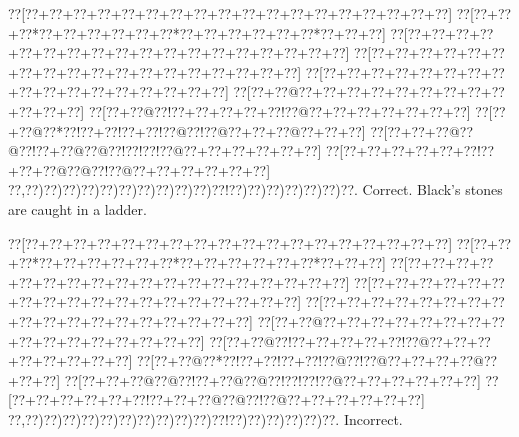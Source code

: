 \documentclass[a5paper]{article}
\begin{document}
\begin{center}
{\goo
\0??[\0??+\0??+\0??+\0??+\0??+\0??+\0??+\0??+\0??+\0??+\0??+\0??+\0??+\0??+\0??+\0??+\0??+\0??]
\0??[\0??+\0??+\0??*\0??+\0??+\0??+\0??+\0??+\0??*\0??+\0??+\0??+\0??+\0??+\0??*\0??+\0??+\0??]
\0??[\0??+\0??+\0??+\0??+\0??+\0??+\0??+\0??+\0??+\0??+\0??+\0??+\0??+\0??+\0??+\0??+\0??+\0??]
\0??[\0??+\0??+\0??+\0??+\0??+\0??+\0??+\0??+\0??+\0??+\0??+\0??+\0??+\0??+\0??+\0??+\0??+\0??]
\0??[\0??+\0??+\0??+\0??+\0??+\0??+\0??+\0??+\0??+\0??+\0??+\0??+\0??+\0??+\0??+\0??+\0??]
\0??[\0??+\0??@\0??+\0??+\0??+\0??+\0??+\0??+\0??+\0??+\0??+\0??+\0??+\0??]
\0??[\0??+\0??@\0??!\0??+\0??+\0??+\0??+\0??!\0??@\0??+\0??+\0??+\0??+\0??+\0??+\0??]
\0??[\0??+\0??@\0??*\0??!\0??+\0??!\0??+\0??!\0??@\0??!\0??@\0??+\0??+\0??@\0??+\0??+\0??]
\0??[\0??+\0??+\0??@\0??@\0??!\0??+\0??@\0??@\0??!\0??!\0??!\0??@\0??+\0??+\0??+\0??+\0??+\0??]
\0??[\0??+\0??+\0??+\0??+\0??+\0??!\0??+\0??+\0??@\0??@\0??!\0??@\0??+\0??+\0??+\0??+\0??+\0??]
\0??,\0??)\0??)\0??)\0??)\0??)\0??)\0??)\0??)\0??)\0??)\0??!\0??)\0??)\0??)\0??)\0??)\0??)\0??.
}
Correct. Black's stones are caught in a ladder.

\end{center}
\begin{center}
{\goo
\0??[\0??+\0??+\0??+\0??+\0??+\0??+\0??+\0??+\0??+\0??+\0??+\0??+\0??+\0??+\0??+\0??+\0??+\0??]
\0??[\0??+\0??+\0??*\0??+\0??+\0??+\0??+\0??+\0??*\0??+\0??+\0??+\0??+\0??+\0??*\0??+\0??+\0??]
\0??[\0??+\0??+\0??+\0??+\0??+\0??+\0??+\0??+\0??+\0??+\0??+\0??+\0??+\0??+\0??+\0??+\0??+\0??]
\0??[\0??+\0??+\0??+\0??+\0??+\0??+\0??+\0??+\0??+\0??+\0??+\0??+\0??+\0??+\0??+\0??+\0??+\0??]
\0??[\0??+\0??+\0??+\0??+\0??+\0??+\0??+\0??+\0??+\0??+\0??+\0??+\0??+\0??+\0??+\0??+\0??+\0??]
\0??[\0??+\0??@\0??+\0??+\0??+\0??+\0??+\0??+\0??+\0??+\0??+\0??+\0??+\0??+\0??+\0??+\0??+\0??]
\0??[\0??+\0??@\0??!\0??+\0??+\0??+\0??+\0??!\0??@\0??+\0??+\0??+\0??+\0??+\0??+\0??+\0??]
\0??[\0??+\0??@\0??*\0??!\0??+\0??!\0??+\0??!\0??@\0??!\0??@\0??+\0??+\0??+\0??@\0??+\0??+\0??]
\0??[\0??+\0??+\0??@\0??@\0??!\0??+\0??@\0??@\0??!\0??!\0??!\0??@\0??+\0??+\0??+\0??+\0??+\0??]
\0??[\0??+\0??+\0??+\0??+\0??+\0??!\0??+\0??+\0??@\0??@\0??!\0??@\0??+\0??+\0??+\0??+\0??+\0??]
\0??,\0??)\0??)\0??)\0??)\0??)\0??)\0??)\0??)\0??)\0??)\0??!\0??)\0??)\0??)\0??)\0??)\0??.
}
Incorrect. 

\end{center}
\newpage
\end{document}
